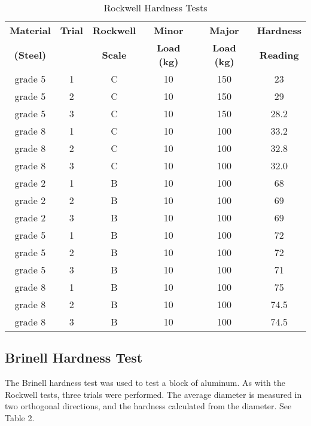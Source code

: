\documentclass{article}
\begin{document}
\begin{table}[h]
  \begin{center}
    \caption{Rockwell Hardness Tests}
    \label{tab:table1}
    \vspace{.5em}
    \begin{tabular}{c|c|c|c|c|c} 
      \textbf{Material} & \textbf{Trial} & \textbf{Rockwell} & \textbf{Minor} & \textbf{Major} & \textbf{Hardness}\\
      \textbf{(Steel)} & & \textbf{Scale} & \textbf{Load (\si{kg})} & \textbf{Load (\si{kg})} & \textbf{Reading}\\
      \hline
      grade 5 & 1 & C & 10 & 150 & 23 \\
      grade 5 & 2 & C & 10 & 150 & 29 \\
      grade 5 & 3 & C & 10 & 150 & 28.2 \\
      \hline
      grade 8 & 1 & C & 10 & 100 & 33.2 \\
      grade 8 & 2 & C & 10 & 100 & 32.8 \\
      grade 8 & 3 & C & 10 & 100 & 32.0 \\
      \hline
      grade 2 & 1 & B & 10 & 100 & 68 \\
      grade 2 & 2 & B & 10 & 100 & 69 \\
      grade 2 & 3 & B & 10 & 100 & 69 \\
      \hline
      grade 5 & 1 & B & 10 & 100 & 72 \\
      grade 5 & 2 & B & 10 & 100 & 72 \\
      grade 5 & 3 & B & 10 & 100 & 71 \\
      \hline
      grade 8 & 1 & B & 10 & 100 & 75 \\
      grade 8 & 2 & B & 10 & 100 & 74.5 \\
      grade 8 & 3 & B & 10 & 100 & 74.5 \\
      \hline
      
    \end{tabular}
  \end{center}
\end{table}

\subsection{Brinell Hardness Test}
The Brinell hardness test was used to test a block of aluminum. As with the Rockwell tests, three trials were performed. The average diameter is measured in two orthogonal directions, and the hardness calculated from the diameter. See Table 2.
\end{document}
